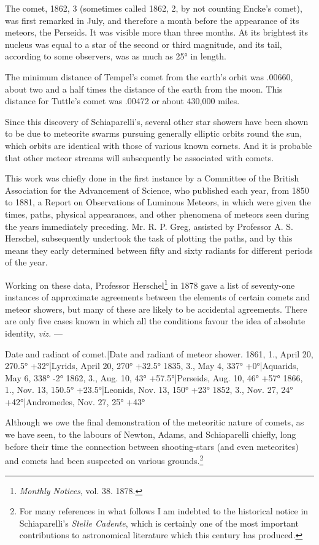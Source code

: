 \documentclass[a4paper, 12pt, oneside, polutonikogreek, english]{article}
\begin{document}
The comet, 1862, 3 (sometimes called 1862, 2, by not counting Encke's comet), was first remarked in July, and therefore a month before the appearance of its meteors, the Perseids. It was visible more than three months. At its brightest its nucleus was equal to a star of the second or third magnitude, and its tail, according to some observers, was as much as 25° in length.

The minimum distance of Tempel's comet from the earth's orbit was .00660, about two and a half times the distance of the earth from the moon. This distance for Tuttle's comet was .00472 or about 430,000 miles.

Since this discovery of Schiaparelli's, several other star showers have been shown to be due to meteorite swarms pursuing generally elliptic orbits round the sun, which orbits are identical with those of various known cornets. And it is probable that other meteor streams will subsequently be associated with comets.

This work was chiefly done in the first instance by a Committee of the British Association for the Advancement of Science, who published each year, from 1850 to 1881, a Report on Observations of Luminous Meteors, in which were given the times, paths, physical appearances, and other phenomena of meteors seen during the years immediately preceding. Mr. R. P. Greg, assisted by Professor A. S. Herschel, subsequently undertook the task of plotting the paths, and by this means they early determined between fifty and sixty radiants for different periods of the year.

Working on these data, Professor Herschel\footnote{\emph{Monthly Notices}, vol. 38. 1878.} in 1878 gave a list of seventy-one instances of approximate agreements between the elements of certain comets and meteor showers, but many of these are likely to be accidental agreements. There are only five cases known in which all the conditions favour the idea of absolute identity, \emph{viz.} ---

Date and radiant of comet.|Date and radiant of meteor shower. 
1861, 1., April 20, 270.5° +32°|Lyrids, April 20, 270° +32.5° 
1835, 3., May 4, 337° +0°|Aquarids, May 6, 338° -2° 
1862, 3., Aug. 10, 43° +57.5°|Perseids, Aug. 10, 46° +57° 
1866, 1., Nov. 13, 150.5° +23.5°|Leonids, Nov. 13, 150° +23° 
1852, 3., Nov. 27, 24° +42°|Andromedes, Nov. 27, 25° +43°

Although we owe the final demonstration of the meteoritic nature of comets, as we have seen, to the labours of Newton, Adams, and Schiaparelli chiefly, long before their time the connection between shooting-stars (and even meteorites) and comets had been suspected on various grounds.\footnote{For many references in what follows I am indebted to the historical notice in Schiaparelli's \emph{Stelle Cadente}, which is certainly one of the most important contributions to astronomical literature which this century has produced.}
\end{document}
